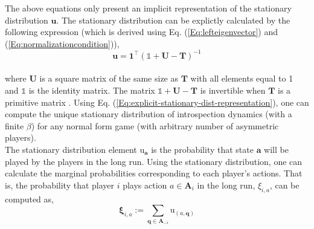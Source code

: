 \documentclass[11pt]{article}
\theoremstyle{plainCl1}
\theoremstyle{plainCl2}
\newcommand{\A}{\mathbf{A}}
\newcommand{\abf}{\mathbf{a}}
\newcommand{\qbf}{\mathbf{q}}
\newcommand{\T}{\mathbf{T}}
\newcommand{\ubf}{\mathbf{u}}
\begin{document}
\noindent The above equations only present an implicit representation of the stationary distribution $\ubf$. The stationary distribution can be explictly calculated by the following expression (which is derived using Eq. (\ref{Eq:lefteigenvector}) and (\ref{Eq:normalizationcondition})),
\begin{equation}
\ubf = \mathbf{1}^\intercal (\mathbb{1} + \mathbf{U} - \T)^{-1}
\label{Eq:explicit-stationary-dist-representation}
\end{equation} \\
where $\mathbf{U}$ is a square matrix of the same size as $\T$ with all elements equal to 1 and $\mathbb{1}$ is the identity matrix. The matrix $\mathbb{1} + \mathbf{U} - \T$ is invertible when $\T$ is a primitive matrix \cite{Couto:NJP:2022}. Using Eq. (\ref{Eq:explicit-stationary-dist-representation}), one can compute the unique stationary distribution of introspection dynamics (with a finite $\beta$) for any normal form game (with arbitrary number of asymmetric players).\\

\noindent The stationary distribution element $\mathrm{u}_\abf$ is the probability that state $\abf$ will be played by the players in the long run. Using the stationary distribution, one can calculate the marginal probabilities corresponding to each player's actions. That is, the probability that player $i$ plays action $a \in \A_i$ in the long run, $\xi_{i,a}$, can be computed as,
\begin{equation}
\mathbf{\xi}_{i,a} := \sum_{\qbf \in \A_{-i}} \mathrm{u}_{(a, \qbf)}
\label{Eq:marginal-definition}
\end{equation}
\end{document}
